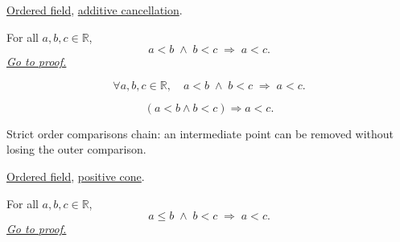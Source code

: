 \begin{dependencies}
\hyperref[def:real-ordered-field]{Ordered field},
\hyperref[cor:additive-cancellation-on-q]{additive cancellation}.
\end{dependencies}


\begin{theorem}
\label{thm:ineq-transitivity-strict}
For all $a, b, c \in \mathbb{R}$,
\[
  a < b \;\land\; b < c \;\Rightarrow\; a < c.
\]
\hyperref[prf:ineq-transitivity-strict]{\textit{Go to proof.}}
\end{theorem}



\begin{remark*}
\[
  \forall a, b, c \in \mathbb{R},\quad
  a < b \;\land\; b < c \;\Rightarrow\; a < c.
\]
\end{remark*}

\begin{remark*}
\[
(a<b\land b<c)\Rightarrow a<c.
\]
\end{remark*}

\begin{remark*}[Interpretation]
Strict order comparisons chain: an intermediate point can be removed without losing the outer comparison.
\end{remark*}

\begin{dependencies}
\hyperref[def:real-ordered-field]{Ordered field},
\hyperref[def:positive-cone]{positive cone}.
\end{dependencies}


\begin{theorem}
\label{thm:ineq-transitivity-mixed}
For all $a, b, c \in \mathbb{R}$,
\[
  a \le b \;\land\; b < c \;\Rightarrow\; a < c.
\]
\hyperref[prf:ineq-transitivity-mixed]{\textit{Go to proof.}}
\end{theorem}



